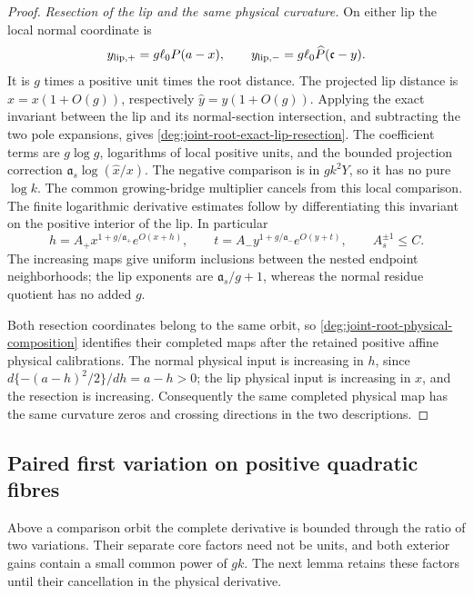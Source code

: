 \begin{proof}
\emph{Resection of the lip and the same physical curvature.}
On either lip the local normal coordinate is
\[
 y_{{\rm lip},+}=g\ell_0P(a-x),\qquad
 y_{{\rm lip},-}=g\ell_0\widehat P(\mathfrak c-y).
\]
It is \(g\) times a positive unit times the root distance.
The projected lip distance is
\(\widehat x=x(1+O(g))\), respectively
\(\widehat y=y(1+O(g))\).
Applying the exact invariant between the lip and its normal-section
intersection, and subtracting the two pole expansions, gives
\eqref{deg:joint-root-exact-lip-resection}.
The coefficient terms are \(g\log g\), logarithms of local
positive units, and the bounded projection correction
\(\mathfrak a_s\log(\widehat x/x)\).
The negative comparison is in \(gk^2Y\), so it has no pure
\(\log k\). The common growing-bridge multiplier cancels from
this local comparison.
The finite logarithmic derivative estimates follow by differentiating
this invariant on the positive interior of the lip.
In particular
\[
 h=A_+x^{1+g/\mathfrak a_+}e^{O(x+h)},\qquad
 t=A_-y^{1+g/\mathfrak a_-}e^{O(y+t)},\qquad A_s^{\pm1}\le C .
\]
The increasing maps give uniform inclusions between the nested
endpoint neighborhoods;
the lip exponents are \(\mathfrak a_s/g+1\), whereas the normal
residue quotient has no added \(g\).

Both resection coordinates belong to the same orbit, so
\eqref{deg:joint-root-physical-composition} identifies their completed
maps after the retained positive affine physical calibrations.
The normal physical input is increasing in \(h\), since
\(d\{-(a-h)^2/2\}/dh=a-h>0\); the lip physical input is
increasing in \(x\), and the resection is increasing.
Consequently the same completed physical map has the same curvature
zeros and crossing directions in the two descriptions.
\end{proof}

\subsection{Paired first variation on positive quadratic fibres}

Above a comparison orbit the complete derivative is bounded through
the ratio of two variations. Their separate core factors need not be
units, and both exterior gains contain a small common power of \(gk\).
The next lemma retains these factors until their cancellation in the
physical derivative.

